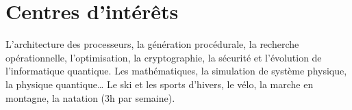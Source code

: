 \documentclass[a4paper,10pt,sans]{moderncv}
\begin{document}

	\vspace*{\deletedSpace}
	\printbibliography[title=Publications]{}


	\vspace*{\deletedSpace}
	\section{Centres d'intérêts}
			{L'architecture des processeurs, la génération procédurale, la recherche opérationnelle, l'optimisation, la cryptographie, la sécurité et l'évolution de l'informatique quantique.}
			{Les mathématiques, la simulation de système physique, la physique quantique\ldots}
			{Le ski et les sports d'hivers, le vélo, la marche en montagne, la natation (3h par semaine).}
\end{document}
